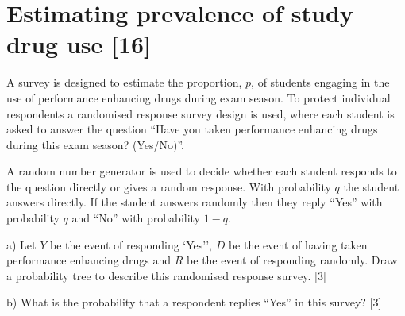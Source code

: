 \documentclass[a4paper, 11pt]{article}
\begin{document}
\section{Estimating prevalence of study drug use [16] }


A survey is designed to estimate the proportion, $p$, of students engaging in the use of performance enhancing drugs during exam season. To protect individual respondents a randomised response survey design is used, where each student is asked to answer the question ``Have you taken performance enhancing drugs during this exam season? (Yes/No)''.

A random number generator is used to decide whether each student responds to the question directly or gives a random response. With probability $q$ the student answers directly. If the student answers randomly then they reply ``Yes'' with probability $q$ and ``No'' with probability $1-q$.

a)  Let $Y$ be the event of responding `Yes'', $D$ be the event of having taken performance enhancing drugs and $R$ be the event of responding randomly. Draw a probability tree to describe this randomised response survey. [3]

%
%

b) What is the probability that a respondent replies ``Yes'' in this survey? [3]

%
%
\end{document}
